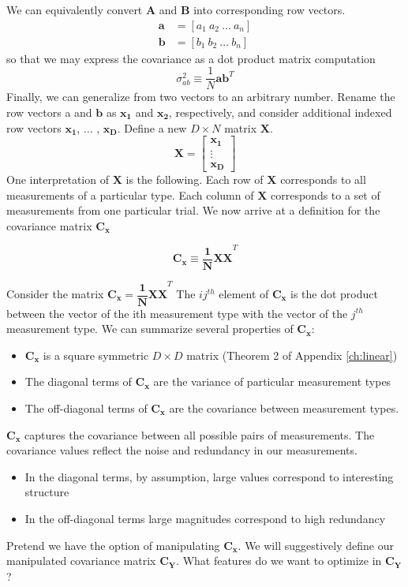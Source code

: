 We can equivalently convert $\pmb{A}$ and $\pmb{B}$ into corresponding row
vectors.
\begin{align*}
\pmb{a} &= [a_1\ a_2\ \dots \ a_n]\\
\pmb{b} &= [b_1\ b_2\ \dots \ b_n]
\end{align*}
so that we may express the covariance as a dot product matrix computation
$$\sigma_{ab}^2 \equiv \dfrac{1}{N}\pmb{ab}^T$$
Finally, we can generalize from two vectors to an arbitrary number. Rename the row vectors a and $\pmb{b}$ as $\pmb{x_1}$ and $\pmb{x_2}$, respectively, and consider additional indexed row vectors $\pmb{x_1}$, $\dots$ , $\pmb{x_D}$. Define a new $D \times N$ matrix $\pmb{X}$.
$$ \pmb{X} = 
\left[ \begin{array}{c}
\pmb{x_1}\\\vdots\\\pmb{x_D}
\end{array}
\right]
$$
One interpretation of $\pmb{X}$ is the following. Each row of $\pmb{X}$ corresponds to all measurements of a particular type. Each column of $\pmb{X}$ corresponds to a set of measurements from one particular trial. We now arrive at a definition for the covariance matrix $\pmb{C_x}$

$$\pmb{C_x \equiv \dfrac{1}{N}XX}^T$$

Consider the matrix $\pmb{C_x = \dfrac{1}{N}XX}^T$ The $ij^{th}$ element of $\pmb{C_x}$ is the dot product between the vector of the ith measurement type with the vector of the $j^{th}$ measurement type. We can summarize several properties of $\pmb{C_x}$:
\begin{itemize}
\item $\pmb{C_x}$ is a square symmetric $D \times D$ matrix (Theorem 2 of Appendix \ref{ch:linear})
\item The diagonal terms of $\pmb{C_x}$ are the variance of particular measurement types
\item The off-diagonal terms of $\pmb{C_x}$ are the covariance between measurement types.
\end{itemize}
$\pmb{C_x}$ captures the covariance between all possible pairs of measurements. The covariance values reflect the noise and redundancy in our measurements.
\begin{itemize}
\item In the diagonal terms, by assumption, large values correspond to interesting structure
\item In the off-diagonal terms large magnitudes correspond to high redundancy
\end{itemize} 
Pretend we have the option of manipulating $\pmb{C_x}$. We will suggestively define our manipulated covariance matrix $\pmb{C_Y}$. What features do we want to optimize in $\pmb{C_Y}$?

